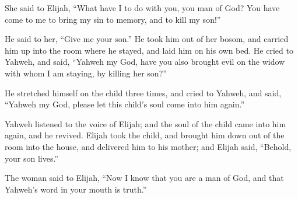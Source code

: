 {She said to Elijah, “What have I to do with you, you man of God? You have come to me to bring my sin to memory, and to kill my son!”
\par }{\PP {}He said to her, “Give me your son.” He took him out of her bosom, and carried him up into the room where he stayed, and laid him on his own bed.
He cried to Yahweh, and said, “Yahweh my God, have you also brought evil on the widow with whom I am staying, by killing her son?”
\par }{\PP {}He stretched himself on the child three times, and cried to Yahweh, and said, “Yahweh my God, please let this child’s soul come into him again.”
\par }{\PP {}Yahweh listened to the voice of Elijah; and the soul of the child came into him again, and he revived.
Elijah took the child, and brought him down out of the room into the house, and delivered him to his mother; and Elijah said, “Behold, your son lives.”
\par }{\PP {}The woman said to Elijah, “Now I know that you are a man of God, and that Yahweh’s word in your mouth is truth.”

}
